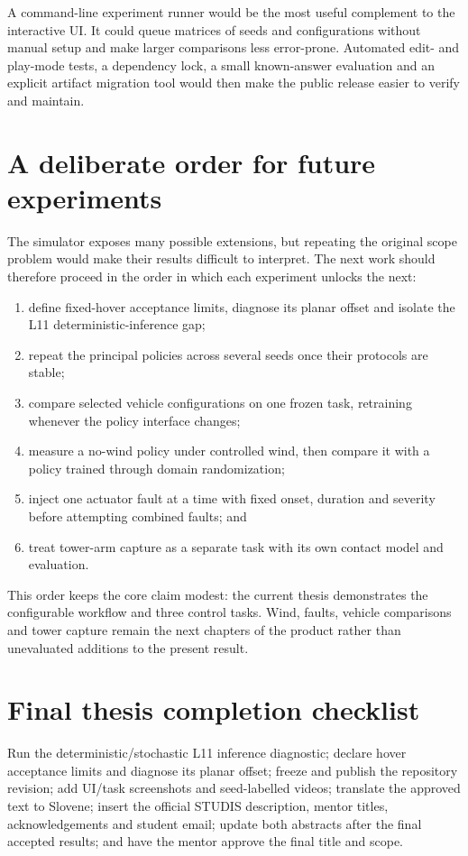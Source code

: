 A command-line experiment runner would be the most useful complement to the interactive UI. It
could queue matrices of seeds and configurations without manual setup and make larger comparisons
less error-prone. Automated edit- and play-mode tests, a dependency lock, a small known-answer
evaluation and an explicit artifact migration tool would then make the public release easier to
verify and maintain.

\section{A deliberate order for future experiments}

The simulator exposes many possible extensions, but repeating the original scope problem would
make their results difficult to interpret. The next work should therefore proceed in the order
in which each experiment unlocks the next:

\begin{enumerate}
  \item define fixed-hover acceptance limits, diagnose its planar offset and isolate the L11
  deterministic-inference gap;
  \item repeat the principal policies across several seeds once their protocols are stable;
  \item compare selected vehicle configurations on one frozen task, retraining whenever the
  policy interface changes;
  \item measure a no-wind policy under controlled wind, then compare it with a policy trained
  through domain randomization;
  \item inject one actuator fault at a time with fixed onset, duration and severity before
  attempting combined faults; and
  \item treat tower-arm capture as a separate task with its own contact model and evaluation.
\end{enumerate}

This order keeps the core claim modest: the current thesis demonstrates the configurable
workflow and three control tasks. Wind, faults, vehicle comparisons and tower capture remain the
next chapters of the product rather than unevaluated additions to the present result.

\section{Final thesis completion checklist}

\begin{thesistodo}
  Run the deterministic/stochastic L11 inference diagnostic; declare hover acceptance limits
  and diagnose its planar offset;
  freeze and publish the repository revision; add UI/task screenshots and seed-labelled videos;
  translate the approved text to Slovene; insert the official STUDIS description, mentor titles,
  acknowledgements and student email; update both abstracts after the final accepted results;
  and have the mentor approve the final title and scope.
\end{thesistodo}
